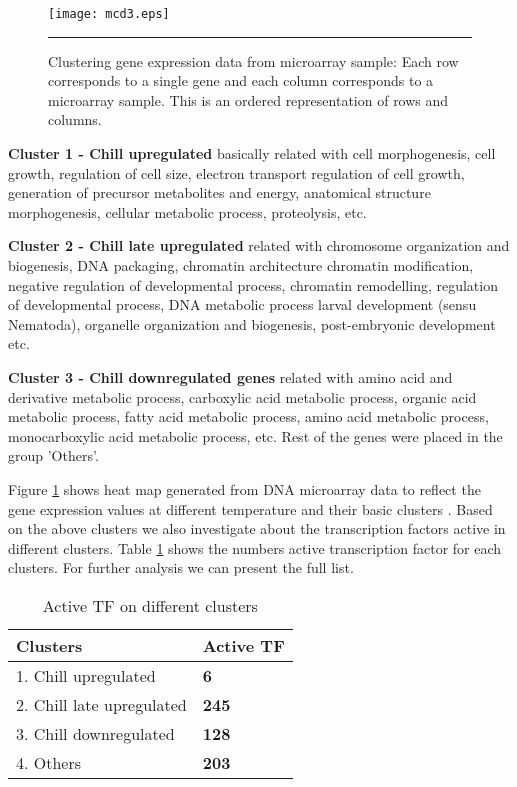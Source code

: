 \begin{figure}
	\centering
		\texttt{[image: mcd3.eps]}
		\rule{35em}{0.5pt}
	\caption[Clustering genes from microarray sample]
		{Clustering gene expression data from microarray sample: Each row corresponds to a single gene and each column corresponds to a microarray sample. This is an ordered representation of rows and columns.}
	\label{fig:Clustering_TF}
\end{figure}

\textbf{Cluster 1 - Chill upregulated} basically related with cell morphogenesis, cell growth, regulation of cell size, electron transport regulation of cell growth, generation of precursor metabolites and energy, anatomical structure morphogenesis, cellular metabolic process, proteolysis, etc.

\textbf{Cluster 2 - Chill late upregulated} related with chromosome organization and biogenesis, DNA packaging, chromatin architecture chromatin modification, negative regulation of developmental process, 
chromatin remodelling, regulation of developmental process, DNA metabolic process larval development (sensu Nematoda), organelle organization and biogenesis, post-embryonic development etc.

\textbf{Cluster 3 - Chill downregulated genes} related with amino acid and derivative metabolic process, carboxylic acid metabolic process, organic acid metabolic process, fatty acid metabolic process,
amino acid metabolic process, monocarboxylic acid metabolic process, etc.  Rest of the genes were placed in the group 'Others'. 

Figure \ref{fig:Clustering_TF} shows heat map generated from DNA microarray data to reflect the gene expression values at different temperature and their basic clusters \cite{Cossins:2007}. Based on the above clusters we also investigate about the transcription factors active in different clusters. Table \ref{table:Active_TF_diff_clusters} shows the numbers active transcription factor for each clusters.
For further analysis we can present the full list.

\begin{table}
	\centering
  \begin{tabular}{l l }
    \toprule
    \textbf{Clusters} & \textbf{Active TF} \\
    \midrule
    1. Chill upregulated & \bf 6 \\ 
    2. Chill late upregulated & \bf245 \\ 
    3. Chill downregulated & \bf128 \\
    4. Others & \bf 203 \\
  \bottomrule
  \end{tabular}
  \caption[Active TF on different clusters]
	  {Active TF on different clusters}
  \label{table:Active_TF_diff_clusters}
\end{table}

